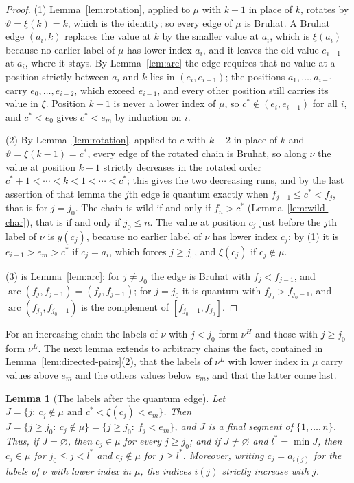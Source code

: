 \documentclass[11pt]{article}
\newtheorem{lemma}[proposition]{Lemma}
\begin{document}
\begin{proof}
(1) Lemma~\ref{lem:rotation}, applied to $\mu$ with $k-1$ in place of
$k$, rotates by $\vartheta=\xi(k)=k$, which is the identity; so every
edge of $\mu$ is Bruhat. A Bruhat edge $(a_i,k)$ replaces the value at
$k$ by the smaller value at $a_i$, which is $\xi(a_i)$ because no
earlier label of $\mu$ has lower index $a_i$, and it leaves the old
value $e_{i-1}$ at $a_i$, where it stays. By Lemma~\ref{lem:arc} the
edge requires that no value at a position strictly between $a_i$ and
$k$ lies in $(e_i,e_{i-1})$; the positions $a_1,\ldots,a_{i-1}$ carry
$e_0,\ldots,e_{i-2}$, which exceed $e_{i-1}$, and every other position
still carries its value in $\xi$. Position $k-1$ is never a lower
index of $\mu$, so $c^\ast\notin(e_i,e_{i-1})$ for all $i$, and
$c^\ast<e_0$ gives $c^\ast<e_m$ by induction on $i$.

(2) By Lemma~\ref{lem:rotation}, applied to $c$ with $k-2$ in place of
$k$ and $\vartheta=\xi(k-1)=c^\ast$, every edge of the rotated chain
is Bruhat, so along $\nu$ the value at position $k-1$ strictly
decreases in the rotated order $c^\ast+1<\cdots<k<1<\cdots<c^\ast$;
this gives the two decreasing runs, and by the last assertion of that
lemma the $j$th edge is quantum exactly when $f_{j-1}\leq c^\ast<f_j$,
that is for $j=j_0$. The chain is wild if and only if $f_n>c^\ast$
(Lemma~\ref{lem:wild-char}), that is if and only if $j_0\leq n$. The
value at position $c_j$ just before the $j$th label of $\nu$ is
$y(c_j)$, because no earlier label of $\nu$ has lower index $c_j$; by
(1) it is $e_{i-1}>e_m>c^\ast$ if $c_j=a_i$, which forces $j\geq j_0$,
and $\xi(c_j)$ if $c_j\notin\mu$.

(3) is Lemma~\ref{lem:arc}: for $j\neq j_0$ the edge is Bruhat with
$f_j<f_{j-1}$, and $\operatorname{arc}(f_j,f_{j-1})=(f_j,f_{j-1})$;
for $j=j_0$ it is quantum with $f_{j_0}>f_{j_0-1}$, and
$\operatorname{arc}(f_{j_0},f_{j_0-1})$ is the complement of
$[f_{j_0-1},f_{j_0}]$.
\end{proof}

For an increasing chain the labels of $\nu$ with $j<j_0$ form
$\nu^H$ and those with $j\geq j_0$ form $\nu^L$. The next lemma
extends to arbitrary chains the fact, contained in
Lemma~\ref{lem:directed-pairs}(2), that the labels of $\nu^L$ with
lower index in $\mu$ carry values above $e_m$ and the others values
below $e_m$, and that the latter come last.

\begin{lemma}[The labels after the quantum edge]\label{lem:after-quantum}
Let $J=\{j:\ c_j\notin\mu\text{ and }c^\ast<\xi(c_j)<e_m\}$. Then
$J=\{j\geq j_0:\ c_j\notin\mu\}=\{j\geq j_0:\ f_j<e_m\}$, and $J$ is a
final segment of $\{1,\ldots,n\}$. Thus, if $J=\varnothing$, then
$c_j\in\mu$ for every $j\geq j_0$; and if $J\neq\varnothing$ and
$l^\ast=\min J$, then $c_j\in\mu$ for $j_0\leq j<l^\ast$ and
$c_j\notin\mu$ for $j\geq l^\ast$. Moreover, writing $c_j=a_{i(j)}$
for the labels of $\nu$ with lower index in $\mu$, the indices $i(j)$
strictly increase with $j$.
\end{lemma}
\end{document}
